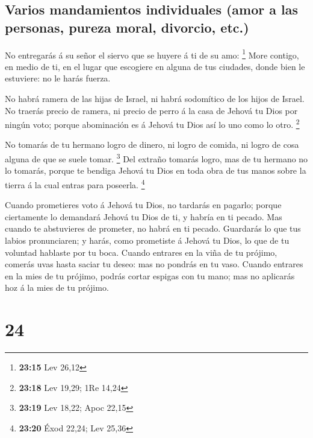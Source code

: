 \hypertarget{varios-mandamientos-individuales-amor-a-las-personas-pureza-moral-divorcio-etc.}{%
\subsection{Varios mandamientos individuales (amor a las personas,
pureza moral, divorcio,
etc.)}\label{varios-mandamientos-individuales-amor-a-las-personas-pureza-moral-divorcio-etc.}}

 No entregarás á su señor el siervo que se huyere á ti de
su amo: \footnote{\textbf{23:15} Lev 26,12}  More contigo,
en medio de ti, en el lugar que escogiere en alguna de tus ciudades,
donde bien le estuviere: no le harás fuerza.

 No habrá ramera de las hijas de Israel, ni habrá
sodomítico de los hijos de Israel.  No traerás precio de
ramera, ni precio de perro á la casa de Jehová tu Dios por ningún voto;
porque abominación es á Jehová tu Dios así lo uno como lo otro.
\footnote{\textbf{23:18} Lev 19,29; 1Re 14,24}

 No tomarás de tu hermano logro de dinero, ni logro de
comida, ni logro de cosa alguna de que se suele tomar. \footnote{\textbf{23:19}
  Lev 18,22; Apoc 22,15}  Del extraño tomarás logro, mas de
tu hermano no lo tomarás, porque te bendiga Jehová tu Dios en toda obra
de tus manos sobre la tierra á la cual entras para poseerla. \footnote{\textbf{23:20}
  Éxod 22,24; Lev 25,36}

 Cuando prometieres voto á Jehová tu Dios, no tardarás en
pagarlo; porque ciertamente lo demandará Jehová tu Dios de ti, y habría
en ti pecado.  Mas cuando te abstuvieres de prometer, no
habrá en ti pecado.  Guardarás lo que tus labios
pronunciaren; y harás, como prometiste á Jehová tu Dios, lo que de tu
voluntad hablaste por tu boca.  Cuando entrares en la viña
de tu prójimo, comerás uvas hasta saciar tu deseo: mas no pondrás en tu
vaso.  Cuando entrares en la mies de tu prójimo, podrás
cortar espigas con tu mano; mas no aplicarás hoz á la mies de tu
prójimo.

\hypertarget{section-23}{%
\section{24}\label{section-23}}

